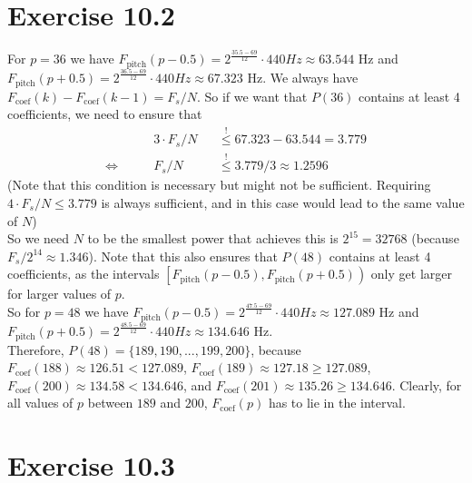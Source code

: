 \documentclass[12pt]{article}
\begin{document}
\section*{Exercise 10.2}
For $p = 36$ we have $F_{\text{pitch}}(p-0.5) = 2^{\frac{35.5 - 69}{12}}\cdot 440 Hz \approx 63.544 \text{ Hz}$ and
$F_{\text{pitch}}(p+0.5) = 2^{\frac{36.5 - 69}{12}}\cdot 440 Hz \approx 67.323 \text{ Hz}$. We always have $F_{\text{coef}}(k) - F_{\text{coef}}(k-1) = F_{s} / N$. So if we want that $P(36)$ contains at least 4 coefficients, we need to ensure that \begin{align*}
&3 \cdot F_{s} / N &&\overset{!}{\leq} 67.323 - 63.544 = 3.779\\
\Leftrightarrow \qquad & F_{s} / N &&\overset{!}{\leq} 3.779 / 3 \approx 1.2596
\end{align*}
(Note that this condition is necessary but might not be sufficient. Requiring $4 \cdot F_{s} / N \leq 3.779$ is always sufficient, and in this case would lead to the same value of $N$)\\
So we need $N$ to be the smallest power that achieves this is $2^{15} = 32768$ (because $F_{s}/ 2^{14} \approx 1.346$).
Note that this also ensures that $P(48)$ contains at least 4 coefficients, as the intervals $\left[F_{\text{pitch}}(p-0.5),F_{\text{pitch}}(p+0.5)\right)$ only get larger for larger values of $p$.\\ 
So for $p=48$ we have $F_{\text{pitch}}(p-0.5) = 2^{\frac{47.5 - 69}{12}}\cdot 440 Hz \approx 127.089 \text{ Hz}$ and
$F_{\text{pitch}}(p+0.5) = 2^{\frac{48.5 - 69}{12}}\cdot 440 Hz \approx 134.646 \text{ Hz.}$\\
Therefore, $P(48) = \lbrace 189,190,...,199,200 \rbrace$, because $F_{\text{coef}}(188) \approx 126.51 < 127.089$, $F_{\text{coef}}(189) \approx 127.18 \geq 127.089$, $F_{\text{coef}}(200) \approx 134.58 < 134.646$, and $F_{\text{coef}}(201) \approx 135.26 \geq 134.646$. Clearly, for all values of $p$ between $189$ and $200$, $F_{\text{coef}}(p)$ has to lie in the interval.



\section*{Exercise 10.3}
\end{document}
